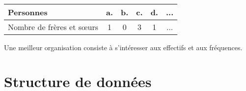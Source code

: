 \documentclass[paper=a4, fontsize=9pt]{scrartcl} %
\begin{document}
\begin{multicols}{2}
  \begin{center}
    \begin{tabular}{| l || c | c | c | c | c |}
      \hline
      Personnes    &  a. & b. & c. & d. & ...\\
      \hline
      Nombre de frères et sœurs & 1 & 0 & 3 & 1 & ...\\
      \hline
    \end{tabular}
  \end{center}

  Une meilleur organisation consiste à s'intéresser aux effectifs et aux fréquences.
\end{multicols}
\section{Structure de données}
\end{document}
